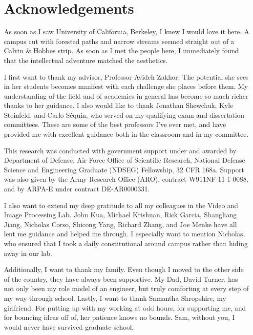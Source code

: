 \documentclass[12pt,onecolumn,oneside]{book}
\begin{document}
\newpage
\cleardoublepage
{}
{}
\chapter*{Acknowledgements}

As soon as I saw University of California, Berkeley, I knew I would love it here.  A campus cut with forested paths and narrow streams seemed straight out of a Calvin \& Hobbes strip.  As soon as I met the people here, I immediately found that the intellectual adventure matched the aesthetics.

I first want to thank my advisor, Professor Avideh Zakhor.  The potential she sees in her students becomes manifest with each challenge she places before them.  My understanding of the field and of academics in general has become so much richer thanks to her guidance.  I also would like to thank Jonathan Shewchuk, Kyle Steinfeld, and Carlo S\'equin, who served on my qualifying exam and dissertation committees.  These are some of the best professors I've ever met, and have provided me with excellent guidance both in the classroom and in my committee.

This research was conducted with government support under and awarded by Department of Defense, Air Force Office of Scientific Research, National Defense Science and Engineering Graduate (NDSEG) Fellowship, 32 CFR 168a.  Support was also given by the Army Research Office (ARO), contract W911NF-11-1-0088, and by ARPA-E under contract DE-AR0000331.

I also want to extend my deep gratitude to all my colleagues in the Video and Image Processing Lab.  John Kua, Michael Krishnan, Rick Garcia, Shangliang Jiang, Nicholas Corso, Shicong Yang, Richard Zhang, and Joe Menke have all lent me guidance and helped me through.  I especially want to mention Nicholas, who ensured that I took a daily constitutional around campus rather than hiding away in our lab.

Additionally, I want to thank my family.  Even though I moved to the other side of the country, they have always been supportive.  My Dad, David Turner, has not only been my role model of an engineer, but truly comforting at every step of my way through school.  Lastly, I want to thank Samantha Shropshire, my girlfriend.  For putting up with my working at odd hours, for supporting me, and for bouncing ideas off of, her patience knows no bounds.  Sam, without you, I would never have survived graduate school.
\end{document}
